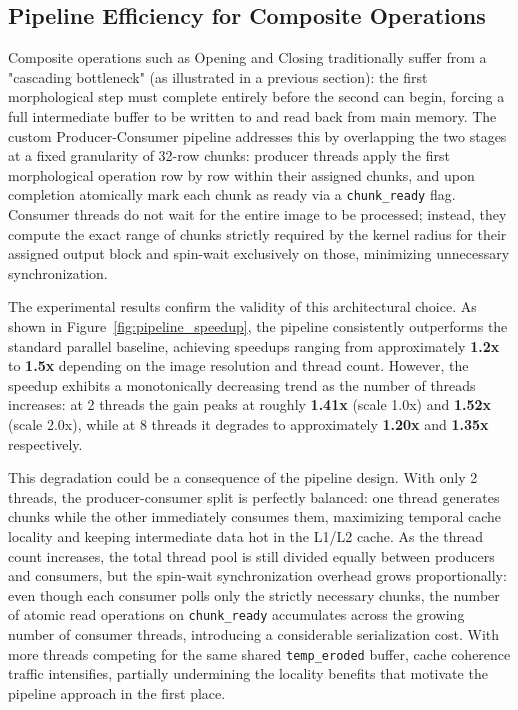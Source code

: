 \documentclass[10pt,twocolumn,letterpaper]{article}
\begin{document}
\subsection{Pipeline Efficiency for Composite Operations}
Composite operations such as Opening and Closing traditionally suffer from a 
"cascading bottleneck" (as illustrated in a previous section): the first morphological step must complete entirely 
before the second can begin, forcing a full intermediate buffer to be written to 
and read back from main memory. The custom Producer-Consumer pipeline addresses 
this by overlapping the two stages at a fixed granularity of 32-row chunks: 
producer threads apply the first morphological operation row by row within their 
assigned chunks, and upon completion atomically mark each chunk as ready via a 
\lstinline|chunk_ready| flag. Consumer threads do not wait for the entire image 
to be processed; instead, they compute the exact range of chunks strictly required 
by the kernel radius for their assigned output block and spin-wait exclusively on 
those, minimizing unnecessary synchronization.

The experimental results confirm the validity of this architectural choice.
As shown in Figure~\ref{fig:pipeline_speedup}, the 
pipeline consistently outperforms the standard parallel baseline, achieving speedups 
ranging from approximately \textbf{1.2x} to \textbf{1.5x} depending on the image 
resolution and thread count. However, the speedup exhibits a 
monotonically decreasing trend as the number of threads increases: at 2 
threads the gain peaks at roughly \textbf{1.41x} (scale 1.0x) and \textbf{1.52x} 
(scale 2.0x), while at 8 threads it degrades to approximately \textbf{1.20x} and 
\textbf{1.35x} respectively.

This degradation could be a consequence of the pipeline design. With 
only 2 threads, the producer-consumer split is perfectly balanced: one thread 
generates chunks while the other immediately consumes them, maximizing temporal 
cache locality and keeping intermediate data hot in the L1/L2 cache. As the thread 
count increases, the total thread pool is still divided equally between producers 
and consumers, but the spin-wait synchronization overhead grows 
proportionally: even though each consumer polls only the strictly necessary chunks, 
the number of atomic read operations on \lstinline|chunk_ready| accumulates across 
the growing number of consumer threads, introducing a considerable serialization 
cost. With more threads competing for the same shared 
\lstinline|temp_eroded| buffer, cache coherence traffic intensifies, partially 
undermining the locality benefits that motivate the pipeline approach in the 
first place.
\end{document}
